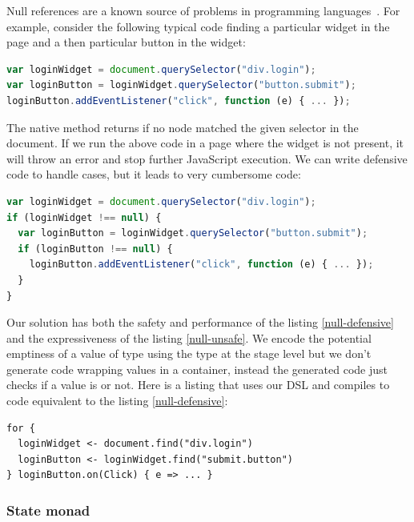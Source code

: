 \documentclass[american,english,runningheads]{llncs}
\begin{document}
Null references are a known source of problems in programming languages~\cite{Hoare09_Null,Nanda09_Null}. For
example, consider the following typical code finding a particular widget in the page and a then particular button in
the widget:

\begin{lstlisting}[language=JavaScript,label=null-unsafe,caption=Unsafe code]
var loginWidget = document.querySelector("div.login");
var loginButton = loginWidget.querySelector("button.submit");
loginButton.addEventListener("click", function (e) { ... });
\end{lstlisting}

The native  method returns  if no node matched the given selector in the document. If
we run the above code in a page where the widget is not present, it will throw an error and stop further JavaScript
execution. We can write defensive code to handle  cases, but it leads to very cumbersome code:

\begin{lstlisting}[language=JavaScript,label=null-defensive,caption=Defensive programming to handle null references]
var loginWidget = document.querySelector("div.login");
if (loginWidget !== null) {
  var loginButton = loginWidget.querySelector("button.submit");
  if (loginButton !== null) {
    loginButton.addEventListener("click", function (e) { ... });
  }
}
\end{lstlisting}

Our solution has both the safety and performance of the listing \ref{null-defensive} and the expressiveness of the
listing \ref{null-unsafe}. We encode the potential emptiness of a value of type  using the
 type at the stage level but we don’t generate code wrapping values in a container, instead the
generated code just checks if a value is  or not. Here is a listing that uses our DSL and compiles to code
equivalent to the listing \ref{null-defensive}:

\begin{lstlisting}
for {
  loginWidget <- document.find("div.login")
  loginButton <- loginWidget.find("submit.button")
} loginButton.on(Click) { e => ... }
\end{lstlisting}

\subsubsection{State monad}
\end{document}
